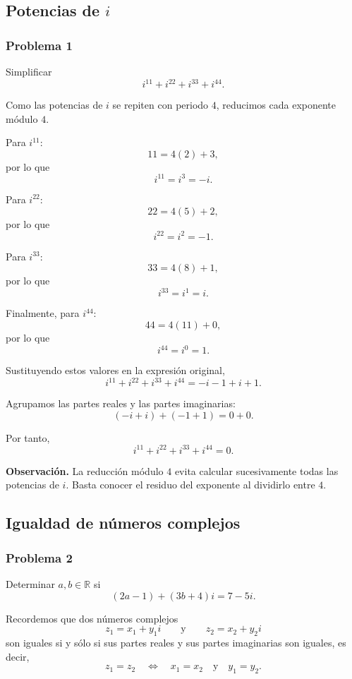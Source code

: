 \documentclass[12pt]{article}
\begin{document}
\subsection{Potencias de $i$}

\subsubsection*{Problema 1}

Simplificar
\[
i^{11}+i^{22}+i^{33}+i^{44}.
\]

Como las potencias de $i$ se repiten con periodo $4$, reducimos cada
exponente módulo $4$.

Para $i^{11}$:
\[
11=4(2)+3,
\]
por lo que
\[
i^{11}=i^3=-i.
\]

Para $i^{22}$:
\[
22=4(5)+2,
\]
por lo que
\[
i^{22}=i^2=-1.
\]

Para $i^{33}$:
\[
33=4(8)+1,
\]
por lo que
\[
i^{33}=i^1=i.
\]

Finalmente, para $i^{44}$:
\[
44=4(11)+0,
\]
por lo que
\[
i^{44}=i^0=1.
\]

Sustituyendo estos valores en la expresión original,
\[
i^{11}+i^{22}+i^{33}+i^{44}
=
-i-1+i+1.
\]

Agrupamos las partes reales y las partes imaginarias:
\[
(-i+i)+(-1+1)=0+0.
\]

Por tanto,
\[
\boxed{
i^{11}+i^{22}+i^{33}+i^{44}=0
}.
\]

\medskip

\noindent
\textbf{Observación.}
La reducción módulo $4$ evita calcular sucesivamente todas las potencias de
$i$. Basta conocer el residuo del exponente al dividirlo entre $4$.

\subsection{Igualdad de números complejos}

\subsubsection*{Problema 2}

Determinar $a,b\in\mathbb{R}$ si
\[
(2a-1)+(3b+4)i=7-5i.
\]

Recordemos que dos números complejos
\[
z_1=x_1+y_1i
\qquad\text{y}\qquad
z_2=x_2+y_2i
\]
son iguales si y sólo si sus partes reales y sus partes imaginarias son
iguales, es decir,
\[
z_1=z_2
\quad\Longleftrightarrow\quad
x_1=x_2
\quad\text{y}\quad
y_1=y_2.
\]
\end{document}
